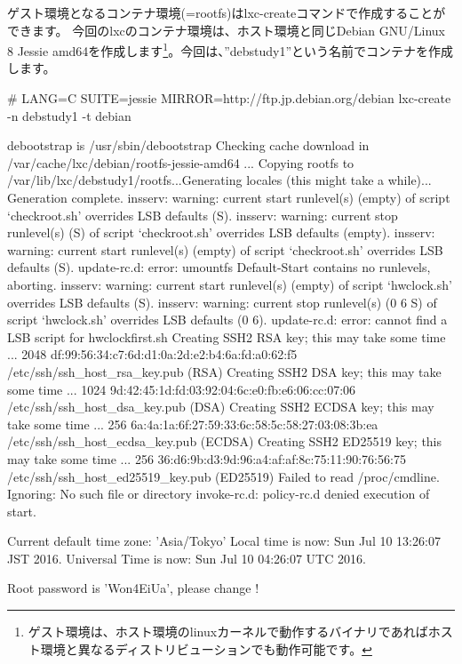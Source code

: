 \documentclass[mingoth,a4paper]{jsarticle}
\begin{document}
ゲスト環境となるコンテナ環境(=rootfs)はlxc-createコマンドで作成することができます。
今回のlxcのコンテナ環境は、ホスト環境と同じDebian GNU/Linux 8 Jessie amd64を作成します\footnote{ゲスト環境は、ホスト環境のlinuxカーネルで動作するバイナリであればホスト環境と異なるディストリビューションでも動作可能です。}。今回は、''debstudy1''という名前でコンテナを作成します。

\begin{commandline}
  # LANG=C SUITE=jessie MIRROR=http://ftp.jp.debian.org/debian lxc-create -n debstudy1 -t debian

  debootstrap is /usr/sbin/debootstrap
  Checking cache download in /var/cache/lxc/debian/rootfs-jessie-amd64 ...
  Copying rootfs to /var/lib/lxc/debstudy1/rootfs...Generating locales (this might take a while)...
  Generation complete.
  insserv: warning: current start runlevel(s) (empty) of script `checkroot.sh' overrides LSB defaults (S).
  insserv: warning: current stop runlevel(s) (S) of script `checkroot.sh' overrides LSB defaults (empty).
  insserv: warning: current start runlevel(s) (empty) of script `checkroot.sh' overrides LSB defaults (S).
  update-rc.d: error: umountfs Default-Start contains no runlevels, aborting.
  insserv: warning: current start runlevel(s) (empty) of script `hwclock.sh' overrides LSB defaults (S).
  insserv: warning: current stop runlevel(s) (0 6 S) of script `hwclock.sh' overrides LSB defaults (0 6).
  update-rc.d: error: cannot find a LSB script for hwclockfirst.sh
  Creating SSH2 RSA key; this may take some time ...
  2048 df:99:56:34:c7:6d:d1:0a:2d:e2:b4:6a:fd:a0:62:f5 /etc/ssh/ssh_host_rsa_key.pub (RSA)
  Creating SSH2 DSA key; this may take some time ...
  1024 9d:42:45:1d:fd:03:92:04:6c:e0:fb:e6:06:cc:07:06 /etc/ssh/ssh_host_dsa_key.pub (DSA)
  Creating SSH2 ECDSA key; this may take some time ...
  256 6a:4a:1a:6f:27:59:33:6c:58:5c:58:27:03:08:3b:ea /etc/ssh/ssh_host_ecdsa_key.pub (ECDSA)
  Creating SSH2 ED25519 key; this may take some time ...
  256 36:d6:9b:d3:9d:96:a4:af:af:8c:75:11:90:76:56:75 /etc/ssh/ssh_host_ed25519_key.pub (ED25519)
  Failed to read /proc/cmdline. Ignoring: No such file or directory
  invoke-rc.d: policy-rc.d denied execution of start.

  Current default time zone: 'Asia/Tokyo'
  Local time is now:      Sun Jul 10 13:26:07 JST 2016.
  Universal Time is now:  Sun Jul 10 04:26:07 UTC 2016.

  Root password is 'Won4EiUa', please change !
\end{commandline}
\end{document}
